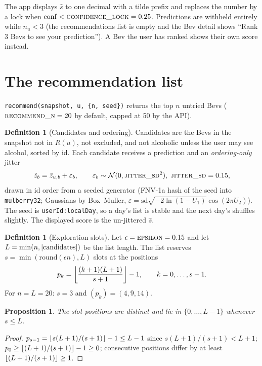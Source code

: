 \documentclass[11pt]{article}
\DeclarePairedDelimiter\floor{\lfloor}{\rfloor}
\DeclarePairedDelimiter\abs{\lvert}{\rvert}
\DeclareMathOperator{\conf}{conf}
\newcommand{\code}[1]{\texttt{#1}}
\newcommand{\zhat}{\hat{z}}
\newcommand{\shat}{\hat{s}}
\theoremstyle{plain}
\newtheorem{proposition}[theorem]{Proposition}
\theoremstyle{definition}
\newtheorem{definition}[theorem]{Definition}
\theoremstyle{remark}
\begin{document}
The app displays $\shat$ to one decimal with a tilde prefix and replaces the number by a lock when $\conf < \textsc{confidence\_lock} = 0.25$. Predictions are withheld entirely while $n_u < 3$ (the recommendations list is empty and the Bev detail shows ``Rank 3 Bevs to see your prediction''). A Bev the user has ranked shows their own score instead.

\section{The recommendation list}\label{sec:recommend}

\code{recommend(snapshot, u, \{n, seed\})} returns the top $n$ untried Bevs ($\textsc{recommend\_n} = 20$ by default, capped at 50 by the API).

\begin{definition}[Candidates and ordering]
Candidates are the Bevs in the snapshot not in $R(u)$, not excluded, and not alcoholic unless the user may see alcohol, sorted by id. Each candidate receives a prediction and an \emph{ordering-only} jitter
\[
\tilde z_b = \zhat_{u,b} + \varepsilon_b, \qquad \varepsilon_b \sim \mathcal{N}(0, \textsc{jitter\_sd}^2),\ \textsc{jitter\_sd} = 0.15,
\]
drawn in id order from a seeded generator (FNV-1a hash of the seed into \code{mulberry32}; Gaussians by Box--Muller, $\varepsilon = \mathrm{sd}\sqrt{-2 \ln(1 - U_1)} \cos(2\pi U_2)$). The seed is \code{userId:localDay}, so a day's list is stable and the next day's shuffles slightly. The displayed score is the un-jittered $\shat$.
\end{definition}

\begin{definition}[Exploration slots]\label{def:slots}
Let $\epsilon = \textsc{epsilon} = 0.15$ and let $L = \min(n, \abs{\text{candidates}})$ be the list length. The list reserves $s = \min(\mathrm{round}(\epsilon n), L)$ slots at the positions
\begin{equation}\label{eq:slots}
p_k = \floor*{\frac{(k+1)(L+1)}{s+1}} - 1, \qquad k = 0, \dots, s-1 .
\end{equation}
For $n = L = 20$: $s = 3$ and $(p_k) = (4, 9, 14)$.
\end{definition}

\begin{proposition}
The slot positions are distinct and lie in $\{0, \dots, L-1\}$ whenever $s \le L$.
\end{proposition}
\begin{proof}
$p_{s-1} = \floor{s(L+1)/(s+1)} - 1 \le L - 1$ since $s(L+1)/(s+1) < L + 1$; $p_0 \ge \floor{(L+1)/(s+1)} - 1 \ge 0$; consecutive positions differ by at least $\floor{(L+1)/(s+1)} \ge 1$.
\end{proof}
\end{document}

